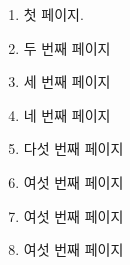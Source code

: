 \documentclass{oblivoir}
\title{\mytitle}
\author{저자 이름}
\begin{document}
\begin{enumerate}
\item
첫 페이지.

\newpage
\item 두 번째 페이지 
\newpage
\item 세 번째 페이지 
\newpage
\item 네 번째 페이지 
\newpage
\item 다섯 번째 페이지 
\newpage
\item 여섯 번째 페이지 
\newpage
\item 여섯 번째 페이지 
\newpage
\item 여섯 번째 페이지 


\end{enumerate}
\end{document}
